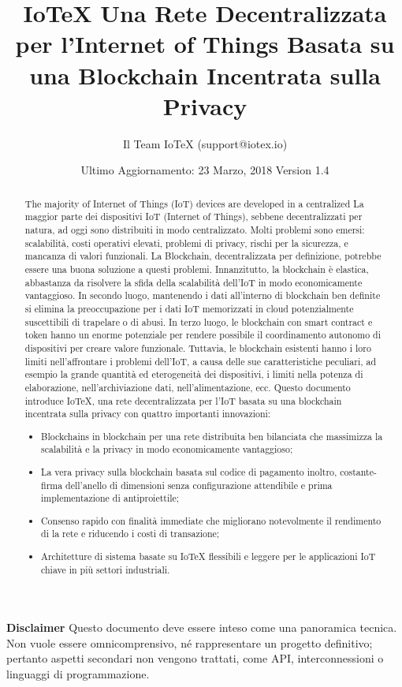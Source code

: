 \documentclass[a4paper,12pt]{article}
\title{IoTeX
\linebreak
\Large Una Rete Decentralizzata per l'Internet of Things
\linebreak
\Large Basata su una Blockchain Incentrata sulla Privacy}
\author{Il Team IoTeX (support@iotex.io)}
\date{Ultimo Aggiornamento: 23 Marzo, 2018
\linebreak Version 1.4}
\begin{document}
\maketitle

\vspace{120}


\textbf{Disclaimer} Questo documento deve essere inteso come una panoramica tecnica. Non vuole essere omnicomprensivo, né rappresentare un progetto definitivo; pertanto aspetti secondari non vengono trattati, come API, interconnessioni o linguaggi di programmazione.  

\pagebreak

\begin{abstract}
The majority of Internet of Things (IoT) devices are developed in a centralized
La maggior parte dei dispositivi IoT (Internet of Things), sebbene decentralizzati per natura, ad oggi sono distribuiti in modo centralizzato. Molti problemi sono emersi: scalabilità, costi operativi elevati, problemi di privacy, rischi per la sicurezza, e mancanza di valori funzionali. La Blockchain, decentralizzata per definizione, potrebbe essere una buona soluzione a questi problemi. Innanzitutto, la blockchain è elastica, abbastanza da risolvere la sfida della scalabilità dell'IoT in modo economicamente vantaggioso. In secondo luogo, mantenendo i dati all'interno di blockchain ben definite si elimina la preoccupazione per i dati IoT memorizzati in cloud potenzialmente suscettibili di trapelare o di abusi. In terzo luogo, le blockchain con smart contract e token hanno un enorme potenziale per rendere possibile il coordinamento autonomo di dispositivi per creare valore funzionale. Tuttavia, le blockchain esistenti hanno i loro limiti nell'affrontare i problemi dell'IoT, a causa delle sue caratteristiche peculiari, ad esempio la grande quantità ed eterogeneità dei dispositivi, i limiti nella potenza di elaborazione, nell'archiviazione dati, nell'alimentazione, ecc. 
Questo documento introduce IoTeX, una rete decentralizzata per l'IoT basata su una blockchain incentrata sulla privacy con quattro importanti innovazioni:

\begin{itemize}

\item{Blockchains in blockchain per una rete distribuita ben bilanciata che massimizza la scalabilità e la privacy in modo economicamente vantaggioso;}

\item{La vera privacy sulla blockchain basata sul codice di pagamento inoltro, costante- firma dell'anello di dimensioni senza configurazione attendibile e prima implementazione di antiproiettile;}

\item{Consenso rapido con finalità immediate che migliorano notevolmente il rendimento di la rete e riducendo i costi di transazione;}

\item{Architetture di sistema basate su IoTeX flessibili e leggere per le applicazioni IoT chiave in più settori industriali.}
\end{itemize}

\end{abstract}
\end{document}
